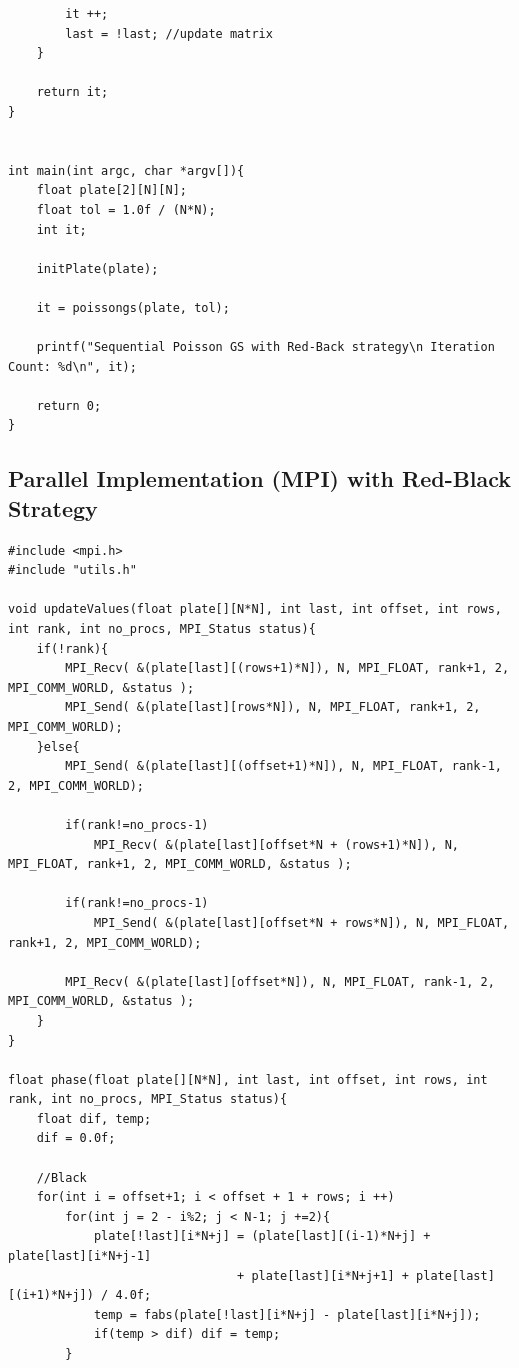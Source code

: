 \documentclass{article}
\begin{document}
\begin{appendices}
\begin{framed}
\begin{verbatim}
        it ++;
        last = !last; //update matrix
    }
    
    return it;
}


int main(int argc, char *argv[]){
    float plate[2][N][N];
    float tol = 1.0f / (N*N);
    int it;

    initPlate(plate);

    it = poissongs(plate, tol);

    printf("Sequential Poisson GS with Red-Back strategy\n Iteration Count: %d\n", it);

    return 0;
}
\end{verbatim}
\end{framed}

\subsection{Parallel Implementation (MPI) with Red-Black Strategy}\label{parRBImp}
\begin{framed}
\begin{verbatim}
#include <mpi.h>
#include "utils.h"

void updateValues(float plate[][N*N], int last, int offset, int rows, int rank, int no_procs, MPI_Status status){
    if(!rank){
        MPI_Recv( &(plate[last][(rows+1)*N]), N, MPI_FLOAT, rank+1, 2, MPI_COMM_WORLD, &status );
        MPI_Send( &(plate[last][rows*N]), N, MPI_FLOAT, rank+1, 2, MPI_COMM_WORLD);
    }else{
        MPI_Send( &(plate[last][(offset+1)*N]), N, MPI_FLOAT, rank-1, 2, MPI_COMM_WORLD);

        if(rank!=no_procs-1)
            MPI_Recv( &(plate[last][offset*N + (rows+1)*N]), N, MPI_FLOAT, rank+1, 2, MPI_COMM_WORLD, &status );

        if(rank!=no_procs-1)
            MPI_Send( &(plate[last][offset*N + rows*N]), N, MPI_FLOAT, rank+1, 2, MPI_COMM_WORLD);

        MPI_Recv( &(plate[last][offset*N]), N, MPI_FLOAT, rank-1, 2, MPI_COMM_WORLD, &status );
    }
}

float phase(float plate[][N*N], int last, int offset, int rows, int rank, int no_procs, MPI_Status status){
    float dif, temp;
    dif = 0.0f;

    //Black
    for(int i = offset+1; i < offset + 1 + rows; i ++)
        for(int j = 2 - i%2; j < N-1; j +=2){
            plate[!last][i*N+j] = (plate[last][(i-1)*N+j] + plate[last][i*N+j-1] 
                                + plate[last][i*N+j+1] + plate[last][(i+1)*N+j]) / 4.0f;
            temp = fabs(plate[!last][i*N+j] - plate[last][i*N+j]);
            if(temp > dif) dif = temp;
        }


\end{verbatim}
\end{framed}
\end{appendices}
\end{document}
